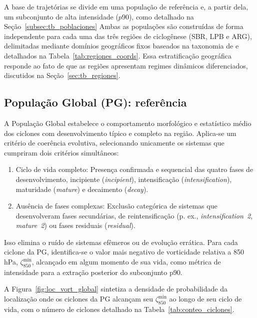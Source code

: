 A base de trajetórias se divide em uma população de referência e, a partir dela, um subconjunto de alta intensidade ($p90$), como detalhado na Seção~\ref{subsec:tb_poblaciones}
Ambas as populações são construídas de forma independente para cada uma das três regiões de ciclogênese (SBR, LPB e ARG), delimitadas mediante domínios geográficos fixos baseados na taxonomia de \citet{gramcianinov2019properties} e detalhados na Tabela~\ref{tab:regiones_coords}.
Essa estratificação geográfica responde ao fato de que as regiões apresentam regimes dinâmicos diferenciados, discutidos na Seção~\ref{sec:tb_regiones}.



\subsection{População Global (PG): referência}\label{subsec:grupo_global}

A População Global estabelece o comportamento morfológico e estatístico médio dos ciclones com desenvolvimento típico e completo na região.
Aplica-se um critério de coerência evolutiva, selecionando unicamente os sistemas que cumpriram dois critérios simultâneos:

\begin{enumerate}
    \item Ciclo de vida completo: Presença confirmada e sequencial das quatro fases de desenvolvimento, incipiente (\textit{incipient}), intensificação (\textit{intensification}), maturidade (\textit{mature}) e decaimento (\textit{decay}).
    \item Ausência de fases complexas: Exclusão categórica de sistemas que desenvolveram fases secundárias, de reintensificação (p. ex., \textit{intensification~2}, \textit{mature~2}) ou fases residuais (\textit{residual}).
\end{enumerate}

Isso elimina o ruído de sistemas efêmeros ou de evolução errática.
Para cada ciclone da PG, identifica-se o valor mais negativo de vorticidade relativa a 850 hPa, $\zeta_{850}^{\min}$, alcançado em algum momento de sua vida, como métrica de intensidade para a extração posterior do subconjunto p90.

A Figura~\ref{fig:loc_vort_global} sintetiza a densidade de probabilidade da localização onde os ciclones da PG alcançam seu $\zeta_{850}^{\min}$ ao longo de seu ciclo de vida, com o número de ciclones detalhado na Tabela~\ref{tab:conteo_ciclones}.

